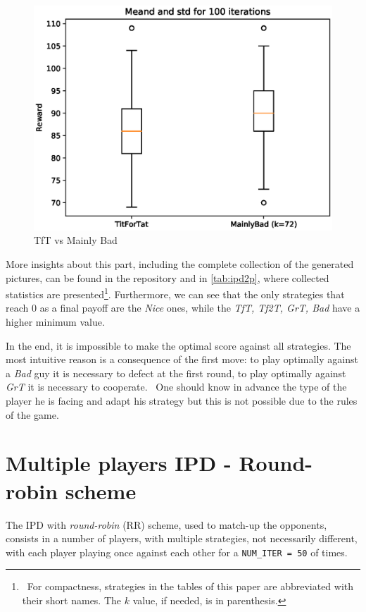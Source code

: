 \documentclass[journal,a4paper,10pt,twoside]{IEEEtran} %
\begin{document}
\begin{figure}[!ht]
    \centering
    \includegraphics[width=1\columnwidth]{../img/ipd2p/ipd2p-boxplot-TitForTat-MainlyBad(k=72)}
    \caption{TfT vs Mainly Bad}
    \label{fig:boxmbvtft}
\end{figure}

More insights about this part, including the complete collection of the generated pictures, can be found in the repository and in \autoref{tab:ipd2p}, where collected statistics are presented\footnote{~For compactness, strategies in the tables of this paper are abbreviated with their short names. The $k$ value, if needed, is in parenthesis.}. Furthermore, we can see that the only strategies that reach $0$ as a final payoff are the \textit{Nice} ones, while the \textit{TfT, Tf2T, GrT, Bad} have a higher minimum value.

In the end, it is impossible to make the optimal score against all strategies. The most intuitive reason is a consequence of the first move: to play optimally against a \textit{Bad} guy it is necessary to defect at the first round, to play optimally against \textit{GrT} it is necessary to cooperate.~\cite{mathieu2017} One should know in advance the type of the player he is facing and adapt his strategy but this is not possible due to the rules of the game. 

\section{Multiple players IPD - Round-robin scheme} \label{s:IPDMP}
The IPD with \textit{round-robin} (RR) scheme, used to match-up the opponents, consists in a number of players, with multiple strategies, not necessarily different, with each player playing once against each other for a \texttt{NUM\_ITER = 50} of times.
\end{document}
